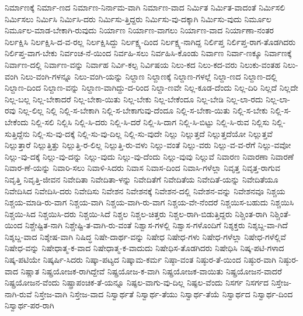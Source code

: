 {ನಿರ್ಮಾಣಕ್ಕೆ
ನಿರ್ಮಾ-ಣದ
ನಿರ್ಮಾಣ-ನಿರ್ನಾಮ-ವಾಗಿ
ನಿರ್ಮಾಣ-ವಾದ
ನಿರ್ಮಿತ
ನಿರ್ಮಿತ-ವಾದಂತೆ
ನಿರ್ಮಿಸಲಿ
ನಿರ್ಮಿಸಲು
ನಿರ್ಮಿಸಿ
ನಿರ್ಮಿಸಿ-ದರು
ನಿರ್ಮಿಸು-ತ್ತಿದ್ದರು
ನಿರ್ಮಿಸು-ವು-ದಕ್ಕಾಗಿ
ನಿರ್ಮಿಸು-ವುದು
ನಿರ್ಮೂಲ
ನಿರ್ಮೂಲ-ಮಾಡ-ಬೇಕಾಗಿ-ರುವುದು
ನಿರ್ಯಾಣ
ನಿರ್ಯಾಣ-ವಾಗಲು
ನಿರ್ಯಾಣ-ವಾದ
ನಿರ್ಯಾಣಾ-ನಂತರ
ನಿರ್ಲಕ್ಷಿಸಿ
ನಿರ್ಲಕ್ಷಿಸಿ-ದ-ವ-ರಲ್ಲ
ನಿರ್ಲಕ್ಷಿಸಿದ್ದು
ನಿರ್ಲಕ್ಷ್ಯ-ದಿಂದ
ನಿರ್ಲಕ್ಷ್ಯ-ನಾಗಿದ್ದ
ನಿರ್ಲಿಪ್ತ
ನಿರ್ಲಿಪ್ತ-ರಾಗ-ತೊಡಗಿದರು
ನಿರ್ಲಿಪ್ತ-ವಾಗ-ಬೇಕು
ನಿರ್ವಂಚ-ನೆ-ಯಿಂದ
ನಿರ್ವಹಿ-ಸಲು
ನಿರ್ವಹಿಸಿ-ಕೊಂಡು
ನಿರ್ವಾಣ
ನಿರ್ವಾ-ಣಕ್ಕೂ
ನಿರ್ವಾಣಕ್ಕೆ
ನಿರ್ವಾಣ-ದಲ್ಲಿ
ನಿರ್ವಾಣ-ವನ್ನು
ನಿರ್ವಾಹ
ನಿರ್ವಿ-ಕಲ್ಪ
ನಿರ್ವಿಷಯ
ನಿಲು-ಕದ
ನಿಲು-ಕದ-ವರು
ನಿಲುಕು-ವಂತಹ
ನಿಲು-ವಂಗಿ
ನಿಲು-ವಂಗಿ-ಗಳನ್ನೂ
ನಿಲು-ವಂಗಿ-ಯನ್ನು
ನಿಲ್ದಾಣ
ನಿಲ್ದಾಣಕ್ಕೆ
ನಿಲ್ದಾಣ-ಗಳಲ್ಲೆ
ನಿಲ್ದಾ-ಣದ
ನಿಲ್ದಾಣ-ದಲ್ಲಿ
ನಿಲ್ದಾಣ-ದಿಂದ
ನಿಲ್ದಾಣ-ವನ್ನು
ನಿಲ್ದಾಣ-ವಾಗಿದ್ದು-ದ-ರಿಂದ
ನಿಲ್ದಾ-ಣವೇ
ನಿಲ್ಲ-ಕೂಡ-ದೆಂದು
ನಿಲ್ಲ-ದಿರಿ
ನಿಲ್ಲದೆ
ನಿಲ್ಲದೇ
ನಿಲ್ಲ-ಬಲ್ಲ
ನಿಲ್ಲ-ಬೇಕಾದರೆ
ನಿಲ್ಲ-ಬೇಕಾ-ಯಿತು
ನಿಲ್ಲ-ಬೇಕು
ನಿಲ್ಲ-ಬೇಕೆಂದೂ
ನಿಲ್ಲ-ಬೇಡಿ
ನಿಲ್ಲ-ಲಾ-ರದು
ನಿಲ್ಲ-ಲಾ-ರವು
ನಿಲ್ಲ-ಲಿಲ್ಲ
ನಿಲ್ಲಿ
ನಿಲ್ಲಿ-ಸ-ಬೇಕಾಗಿ
ನಿಲ್ಲಿ-ಸ-ಬೇಕಾಗುವು-ದೆಂದೂ
ನಿಲ್ಲಿ-ಸ-ಬೇಕಾ-ಯಿತು
ನಿಲ್ಲಿ-ಸ-ಬೇಕು
ನಿಲ್ಲಿ-ಸ-ಬೇಕೆಂದು
ನಿಲ್ಲಿ-ಸಲಿ
ನಿಲ್ಲಿಸಿ
ನಿಲ್ಲಿ-ಸಿ-ದರು
ನಿಲ್ಲಿ-ಸಿ-ದರೆ
ನಿಲ್ಲಿ-ಸಿ-ದಾಗ
ನಿಲ್ಲಿ-ಸಿ-ಬಿಟ್ಟು
ನಿಲ್ಲಿ-ಸಿ-ರುವ
ನಿಲ್ಲಿಸು
ನಿಲ್ಲಿ-ಸುತ್ತಿದ್ದೆನು
ನಿಲ್ಲಿ-ಸು-ವು-ದಕ್ಕೆ
ನಿಲ್ಲಿ-ಸು-ವು-ದಿಲ್ಲ
ನಿಲ್ಲಿ-ಸು-ವುದೇ
ನಿಲ್ಲು
ನಿಲ್ಲುತ್ತದೆ
ನಿಲ್ಲುತ್ತದೆಯೋ
ನಿಲ್ಲುತ್ತವೆ
ನಿಲ್ಲುತ್ತಾರೆ
ನಿಲ್ಲುತ್ತಿತ್ತು
ನಿಲ್ಲುತ್ತಿ-ರ-ಲಿಲ್ಲ
ನಿಲ್ಲುತ್ತಿ-ರು-ವಳು
ನಿಲ್ಲು-ವಂತೆ
ನಿಲ್ಲು-ವರು
ನಿಲ್ಲು-ವ-ವ-ರೆಗೆ
ನಿಲ್ಲು-ವವೋ
ನಿಲ್ಲು-ವು-ದಕ್ಕೆ
ನಿಲ್ಲು-ವು-ದನ್ನು
ನಿಲ್ಲು-ವುದು
ನಿಲ್ಲು-ವು-ದೆಂದು
ನಿಲ್ಲು-ವುವು
ನಿಲ್ಲುವೆ
ನಿವಾರಣ
ನಿವಾರಣಾ
ನಿವಾರಣೆ
ನಿವಾರ-ಣೆ-ಯನ್ನು
ನಿವಾರಿ-ಸಲು
ನಿವಾಳಿ-ಸಿದರು
ನಿವಾಸ
ನಿವಾಸ-ದಿಂದ
ನಿವಾಸಿ-ಗಳೆಲ್ಲಾ
ನಿವೃತ್ತ
ನಿವೃತ್ತ-ರಾಗುವ
ನಿವೃತ್ತಿ
ನಿವೃತ್ತಿ-ಜೀವನ
ನಿವೇದಿತಾ
ನಿವೇದಿತಾ-ಳನ್ನು
ನಿವೇದಿತೆಗೆ
ನಿವೇದಿತೆಯ
ನಿವೇದಿತೆ-ಯನ್ನು
ನಿವೇದಿತೆಯೂ
ನಿವೇದಿಸಿದ
ನಿವೇದಿಸಿ-ದರು
ನಿವೇದಿಸು
ನಿವೇಶನ
ನಿವೇಶನಕ್ಕೆ
ನಿವೇಶನ-ದಲ್ಲಿ
ನಿವೇಶನ-ವನ್ನು
ನಿವೇಶನವೂ
ನಿಶ್ಚಯ
ನಿಶ್ಚಯ-ಮಾಡಿ-ರು-ವಾಗ
ನಿಶ್ಚಯ-ವಾಗಿ
ನಿಶ್ಚಯ-ವಾಗಿ-ರು-ವಾಗ
ನಿಶ್ಚಯ-ವೇ-ನೆಂದರೆ
ನಿಶ್ಚಯಿಸ-ಬಹುದು
ನಿಶ್ಚಯಿಸಿ
ನಿಶ್ಚಯಿ-ಸಿದ
ನಿಶ್ಚಯಿಸಿ-ದರು
ನಿಶ್ಚಯಿ-ಸಿದೆ
ನಿಶ್ಚಲ
ನಿಶ್ಚಲ-ಚಿತ್ತರು
ನಿಶ್ಚಲ-ರಾಗಿ-ಬಿಡುತ್ತಿದ್ದರು
ನಿಶ್ಚಿಂತ-ರಾಗಿ
ನಿಶ್ಚಿಂತೆ-ಯಿಂದ
ನಿಶ್ಚೇಷ್ಟಿತ-ನಾಗಿ
ನಿಶ್ಚೇಷ್ಟಿ-ತ-ವಾಗಿ-ರು-ವಂತೆ
ನಿಶ್ವಾಸ-ಗಳಲ್ಲಿ
ನಿಶ್ವಾಸ-ಗಳೊಂದಿಗೆ
ನಿಶ್ಶಕ್ತರು
ನಿಶ್ಶಬ್ದ-ವಾ-ಗಿದೆ
ನಿಶ್ಶಬ್ದ-ವಾದ
ನಿಶ್ಶೇಷ-ವಾಗಿ
ನಿಷಿದ್ಧ
ನಿಷೇ-ದಾರ್ಥ-ವನ್ನು
ನಿಷೇಧ
ನಿಷೇಧ-ಗಳು
ನಿಷೇಧ-ಗಳೆಲ್ಲಾ
ನಿಷೇಧ-ಗಳೆಲ್ಲಿವೆ
ನಿಷೇಧ-ವನ್ನು
ನಿಷೇಧಾತ್ಮ-ಕ-ವಾದ
ನಿಷೇಧಾತ್ಮ-ಕ-ವಾದುದು
ನಿಷೇಧಿಸ-ತೊಡಗಿದರು
ನಿಷೇಧಿಸಿ
ನಿಷ್ಕ-ಪಟಿ-ಗಳಾದ
ನಿಷ್ಕ-ಪಟಿಯೇ
ನಿಷ್ಕರ್ಷಿ-ಸಿದರು
ನಿಷ್ಕಾ-ಪಟ್ಯದ
ನಿಷ್ಕಾಮ-ಕರ್ಮ
ನಿಷ್ಠಾ-ವಂತ
ನಿಷ್ಠುರ-ತೆ-ಯಿಂದ
ನಿಷ್ಠುರ-ವಾಗಿ
ನಿಷ್ಠುರ-ವಾದ
ನಿಷ್ಣಾತ
ನಿಷ್ಪ್ರಯೋಜಕ-ರಾಗಿದ್ದೇವೆ
ನಿಷ್ಪ್ರಯೋಜ-ಕ-ವಾಗಿ
ನಿಷ್ಪ್ರಯೋಜಕ-ವಾಯಿತು
ನಿಷ್ಪ್ರಯೋಜನ-ವಾದರೆ
ನಿಷ್ಪ್ರಯೋಜನ-ವೆಂದು
ನಿಷ್ಪ್ರಾಪಂಚಿಕ-ತೆ-ಯನ್ನೂ
ನಿಷ್ಫಲ-ವಾಗು-ವು-ದಿಲ್ಲ
ನಿಷ್ಫಲ-ವೆಂದು
ನಿಸರ್ಗ
ನಿಸರ್ಗದ
ನಿಸ್ತೇಜ-ನಾಗಿ-ರುವೆ
ನಿಸ್ತೇಜ-ವಾಗಿ
ನಿಸ್ತೇಜ-ವಾದ
ನಿಸ್ವಾರ್ಥತೆ
ನಿಸ್ವಾರ್ಥ-ತೆಯು
ನಿಸ್ವಾರ್ಥ-ತೆಯೆ
ನಿಸ್ವಾರ್ಥದ
ನಿಸ್ವಾರ್ಥ-ದಿಂದ
ನಿಸ್ವಾರ್ಥ-ಪರ-ರಾಗಿ
}
